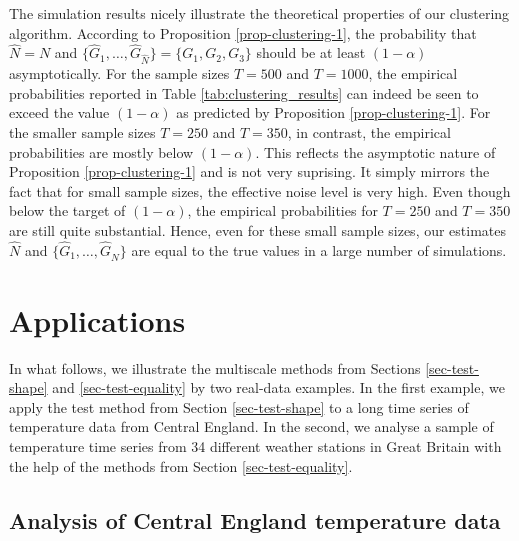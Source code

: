 The simulation results nicely illustrate the theoretical properties of our clustering algorithm. According to Proposition \ref{prop-clustering-1}, the probability that $\widehat{N} = N$ and $\{ \widehat{G}_1,\ldots,\widehat{G}_{\widehat{N}}\} = \{G_1,G_2,G_3\}$ should be at least $(1-\alpha)$ asymptotically. For the sample sizes $T = 500$ and $T = 1000$, the empirical probabilities reported in Table \ref{tab:clustering_results} can indeed be seen to exceed the value $(1-\alpha)$ as predicted by Proposition \ref{prop-clustering-1}. For the smaller sample sizes $T=250$ and $T=350$, in contrast, the empirical probabilities are mostly below $(1-\alpha)$. This reflects the asymptotic nature of Proposition \ref{prop-clustering-1} and is not very suprising. It simply mirrors the fact that for small sample sizes, the effective noise level is very high. Even though below the target of $(1-\alpha)$, the empirical probabilities for $T=250$ and $T=350$ are still quite substantial. Hence, even for these small sample sizes, our estimates $\widehat{N}$ and $\{ \widehat{G}_1,\ldots,\widehat{G}_{\widehat{N}} \}$ are equal to the true values in a large number of simulations. 



\section{Applications}\label{sec-data}


In what follows, we illustrate the multiscale methods from Sections \ref{sec-test-shape} and \ref{sec-test-equality} by two real-data examples. In the first example, we apply the test method from Section \ref{sec-test-shape} to a long time series of temperature data from Central England. In the second, we analyse a sample of temperature time series from 34 different weather stations in Great Britain with the help of the methods from Section \ref{sec-test-equality}. 


\subsection{Analysis of Central England temperature data}\label{subsec-data-1} 


